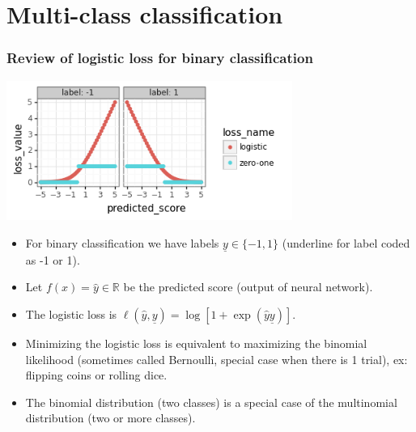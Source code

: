 \message{ !name(06-backprop.tex)}\documentclass{beamer}
\begin{document}
\section{Multi-class classification}

\begin{frame}
  \frametitle{Review of logistic loss for binary classification}
  \includegraphics[width=0.7\textwidth]{2022-02-15-simplex-binary-loss-scores.png}

  \begin{itemize}
  \item For binary classification we have labels
    $\underline y\in\{-1,1\}$ (underline for label coded as -1 or 1).
  \item Let $f(x)=\hat y\in\mathbb R$ be the predicted score (output
    of neural network).
  \item The logistic loss is $\ell(\hat y, \underline y) = \log[1+\exp(\hat y \underline y)]$.
  \item Minimizing the logistic loss is equivalent to maximizing the
    binomial likelihood (sometimes called Bernoulli, special case when
    there is 1 trial), ex: flipping coins or rolling dice.
  \item The binomial distribution (two classes) is a special case of
    the multinomial distribution (two or more classes).
  \end{itemize}

\end{frame}
\end{document}
